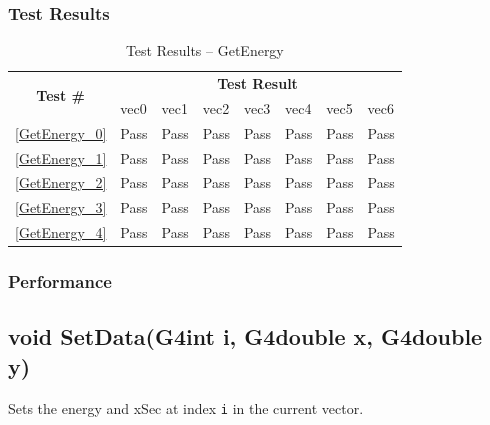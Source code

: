 \documentclass[12pt]{article}
\begin{document}
	\subsubsection{Test Results}
		\begin{table}[H]
		\centering
		\caption{Test Results -- GetEnergy}\label{GetEnergy_acc}
		\begin{tabular}{clllllll}
		\toprule
		\multirow{2}{*}{\bf Test \#} & \multicolumn{7}{c}{\bf Test Result}\\
		& vec0 & vec1 & vec2 & vec3 & vec4 & vec5 & vec6\\\midrule
		\ref{GetEnergy_0} & Pass & Pass & Pass & Pass & Pass & Pass & Pass\\
		\ref{GetEnergy_1} & Pass & Pass & Pass & Pass & Pass & Pass & Pass\\
		\ref{GetEnergy_2} & Pass & Pass & Pass & Pass & Pass & Pass & Pass\\
		\ref{GetEnergy_3} & Pass & Pass & Pass & Pass & Pass & Pass & Pass\\
		\ref{GetEnergy_4} & Pass & Pass & Pass & Pass & Pass & Pass & Pass\\
		\bottomrule
		\end{tabular}
		\end{table}

	\subsubsection{Performance}

\subsection{void SetData(G4int i, G4double x, G4double y)}
	
	Sets the energy and xSec at index \texttt{i} in the current vector. 
	
\end{document}
